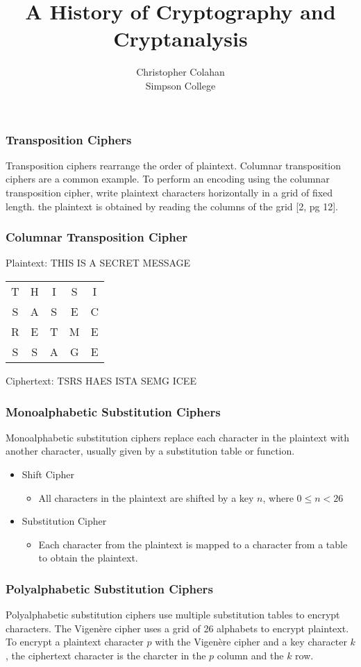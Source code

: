 \documentclass[12pt]{beamer}
\title{A History of Cryptography and Cryptanalysis}
\date{}
\author{Christopher Colahan\\ Simpson College}
\begin{document}
\frame{\titlepage}

\begin{frame}
	\frametitle{Transposition Ciphers}
	Transposition ciphers rearrange the order of plaintext. Columnar transposition ciphers are a common example. To perform an encoding using the columnar transposition cipher, write plaintext characters horizontally in a grid of fixed length. the plaintext is obtained by reading the columns of the grid [2, pg 12].
\end{frame}

\begin{frame}
	\frametitle{Columnar Transposition Cipher}
	Plaintext: THIS IS A SECRET MESSAGE
	\begin{center}
		\begin{tabular}{c c c c c}
			T & H & I & S & I \\
			S & A & S & E & C \\
			R & E & T & M & E \\
			S & S & A & G & E
		\end{tabular}
	\end{center}

	Ciphertext: TSRS HAES ISTA SEMG ICEE
\end{frame}

\begin{frame}
	\frametitle{Monoalphabetic Substitution Ciphers}
	Monoalphabetic substitution ciphers replace each character in the plaintext with another character, usually given by a substitution table or function.
	\begin{itemize}
		\item Shift Cipher
		\begin{itemize}
			\item All characters in the plaintext are shifted by a key $n$, where $0\leq n < 26$
		\end{itemize}
		\item Substitution Cipher
		\begin{itemize}
			\item Each character from the plaintext is mapped to a character from a table to obtain the plaintext.
		\end{itemize}
	\end{itemize}
\end{frame}

\begin{frame}
	\frametitle{Polyalphabetic Substitution Ciphers}
	Polyalphabetic substitution ciphers use multiple substitution tables to encrypt characters. The Vigen\`{e}re cipher uses a grid of 26 alphabets to encrypt plaintext. To encrypt a plaintext character $p$ with the Vigen\`{e}re cipher and a key character $k$, the ciphertext character is the charcter in the $p$ column and the $k$ row.
\end{frame}
\end{document}
